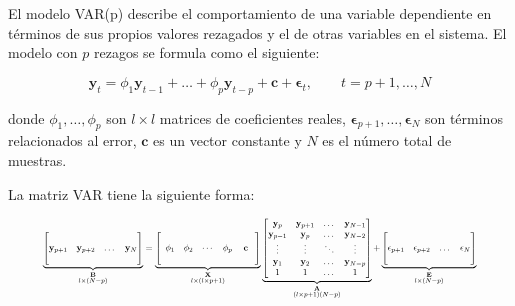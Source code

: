 El modelo VAR(p) describe el comportamiento de una variable dependiente en
términos de sus propios valores rezagados y el de otras variables en el
sistema. El modelo con $p$ rezagos se formula como el siguiente:

\begin{equation}
\label{eq:var}
 \mathbf{y}_t = \phi_1 \mathbf{y}_{t-1}  + \dots +   \phi_p\mathbf{y}_{t-p}
 + \mathbf{c} + \mathbf{\epsilon}_t, \qquad t=p+1, \dots, N
 \end{equation}

\noindent donde ${\phi_1,\dots,\phi_p}$ son $l \times l$ matrices de
coeficientes reales, $\mathbf{\epsilon}_{p+1},\dots,\mathbf{\epsilon}_N$ son
términos relacionados al error, $\mathbf{c}$ es un vector constante y $N$ es el
número total de muestras.

La matriz VAR tiene la siguiente forma:

\begin{equation}
 \label{eq:varmatrix}
 \resizebox{0.9\hsize}{!}{$%
               \underbrace{ \begin{bmatrix}
               \quad \\
               \mathbf{y}_{p+1} &
               \mathbf{y}_{p+2} &
               \dots & 
               \mathbf{y}_N \\
               \quad
               \end{bmatrix}}_{\substack{ \mathbf{B}\\l \times (N-p)}}   
= 
                \underbrace{\left[ 
                \begin{array}{ccccc}
                \quad & \quad & \quad & \quad & \quad \\
                \phi_1  & \phi_2 & \cdots & \phi_p & \mathbf{c} \\  
                \quad &\quad & \quad & \quad & \quad
               \end{array} 
               \right]}_{\substack{ \mathbf{X}\\ l \times (l \times p + 1 )}}
\underbrace{\begin{bmatrix}
   \mathbf{y}_{p}  & \mathbf{y}_{p+1} & \dots    & \mathbf{y}_{N-1}\\
   \mathbf{y}_{p-1}  & \mathbf{y}_{p} & \dots    & \mathbf{y}_{N-2}\\
   \vdots        & \vdots   & \ddots   & \vdots\\
   \mathbf{y}_{1} & \mathbf{y}_{2}   & \dots    & \mathbf{y}_{N-p}\\
   1 & 1   & \dots    & 1 
   \end{bmatrix}}_{\substack{ \mathbf{A}\\ (l\times p +1 )(N-p)}}
+
\underbrace{\begin{bmatrix}
                \quad \\
              \mathbf{\epsilon}_{p+1}  & 
              \mathbf{\epsilon}_{p+2}  & 
              \dots                & 
              \mathbf{\epsilon}_N \\
              \quad
             \end{bmatrix}}_{\substack{\mathbf{E}\\l \times (N-p) }} 
$}
\end{equation}

